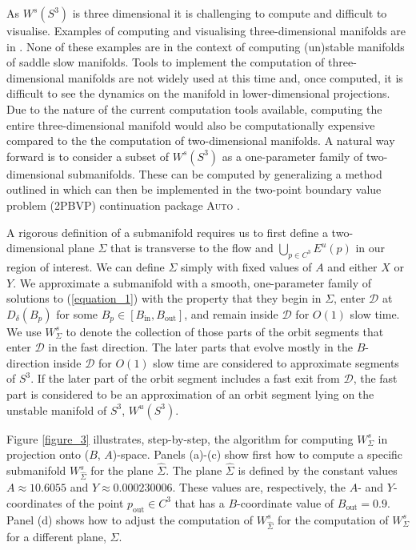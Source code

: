 \documentclass{ws-ijbc}
\begin{document}
As $W^{s}(S^3)$ is three dimensional it is challenging to compute and difficult to visualise.  Examples of computing and visualising three-dimensional manifolds are in \cite{Initial_conditions_volume, Invariant_tori_again, Invariant_tori}.  None of these examples are in the context of computing (un)stable manifolds of saddle slow manifolds.  Tools to implement the computation of three-dimensional manifolds are not widely used at this time and, once computed, it is difficult to see the dynamics on the manifold in lower-dimensional projections.  Due to the nature of the current computation tools available, computing the entire three-dimensional manifold would also be computationally expensive compared to the the computation of two-dimensional manifolds.  A natural way forward is to consider a subset of $W^{s}(S^3)$ as a one-parameter family of two-dimensional submanifolds.  These can be computed by generalizing a method outlined in \cite{Saeed_Paper} which can then be implemented in the two-point boundary value problem (2PBVP) continuation package \textsc{Auto} \cite{AUTO}.  

A rigorous definition of a submanifold requires us to first define a two-dimensional plane $\Sigma$ that is transverse to the flow and $\bigcup_{p \in C^3} E^u(p)$ in our region of interest.  We can define $\Sigma$ simply with fixed values of $A$ and either $X$ or $Y$.  We approximate a submanifold with a smooth, one-parameter family of solutions to (\ref{equation_1}) with the property that they begin in $\Sigma$, enter $\mathscr{D}$ at $D_{\delta}(B_p)$ for some $B_p \in [B_{\text{in}}, B_{\text{out}}]$, and remain inside $\mathscr{D}$ for $O(1)$ slow time.  We use $W^{s}_{\Sigma}$ to denote the collection of those parts of the orbit segments that enter $\mathscr{D}$ in the fast direction.  The later parts that evolve mostly in the $B$-direction inside $\mathscr{D}$ for $O(1)$ slow time are considered to approximate segments of $S^3$.  If the later part of the orbit segment includes a fast exit from $\mathscr{D}$, the fast part is considered to be an approximation of an orbit segment lying on the unstable manifold of $S^3$, $W^{u}(S^3)$.

Figure \ref{figure_3} illustrates, step-by-step, the algorithm for computing $W^s_\Sigma$ in projection onto ($B$, $A$)-space.  Panels (a)-(c) show first how to compute a specific submanifold $W^s_{\widehat{\Sigma}}$ for the plane $\widehat{\Sigma}$.  The plane $\widehat{\Sigma}$ is defined by the constant values $A \approx 10.6055$ and $Y \approx 0.000230006$.  These values are, respectively, the $A$- and $Y$-coordinates of the point $p_{\text{out}} \in C^3$ that has a $B$-coordinate value of $B_{\text{out}}=0.9$.  Panel (d) shows how to adjust the computation of $W^{s}_{\widehat{\Sigma}}$ for the computation of $W^{s}_\Sigma$ for a different plane, $\Sigma$.
\end{document}
